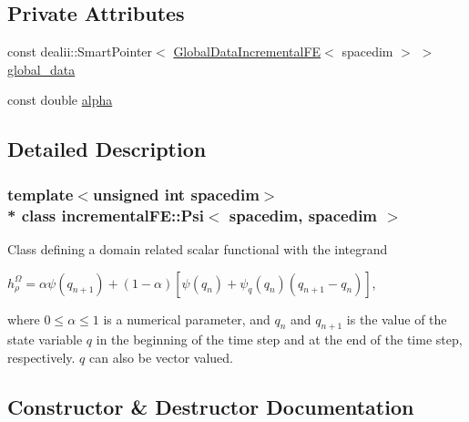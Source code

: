 \subsection*{Private Attributes}
\begin{DoxyCompactItemize}
\item 
const dealii\+::\+Smart\+Pointer$<$ \hyperlink{classincremental_f_e_1_1_global_data_incremental_f_e}{Global\+Data\+Incremental\+FE}$<$ spacedim $>$ $>$ \hyperlink{classincremental_f_e_1_1_psi_3_01spacedim_00_01spacedim_01_4_abf0a4804877fd7cc9bd1b90e52760ba9}{global\+\_\+data}
\item 
const double \hyperlink{classincremental_f_e_1_1_psi_3_01spacedim_00_01spacedim_01_4_af7b8227188dbdd6ada35b9445d96c79d}{alpha}
\end{DoxyCompactItemize}


\subsection{Detailed Description}
\subsubsection*{template$<$unsigned int spacedim$>$\\*
class incremental\+F\+E\+::\+Psi$<$ spacedim, spacedim $>$}

Class defining a domain related scalar functional with the integrand

$ h^\Omega_\rho = \alpha \psi(q_{n+1}) + (1-\alpha) \left[ \psi(q_n) + \psi_q(q_n) (q_{n+1} - q_n)\right] $,

where $0\leq \alpha \leq 1 $ is a numerical parameter, and $q_n$ and $q_{n+1}$ is the value of the state variable $q$ in the beginning of the time step and at the end of the time step, respectively. $q$ can also be vector valued. 

\subsection{Constructor \& Destructor Documentation}
